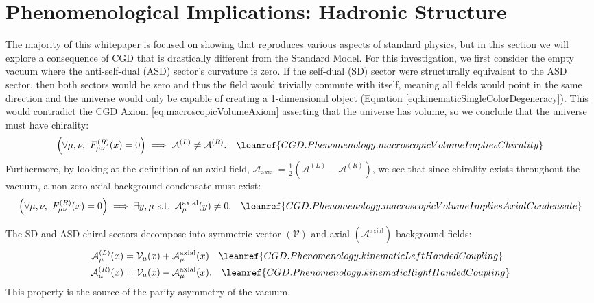 
\section{Phenomenological Implications: Hadronic Structure}
\label{sec:HadronicStructure}

The majority of this whitepaper is focused on showing that \spinFourC reproduces various aspects of standard physics, but in this section we will explore a consequence of CGD that is drastically different from the Standard Model. For this investigation, we first consider the empty vacuum where the anti-self-dual (ASD) sector's curvature is zero. If the self-dual (SD) sector were structurally equivalent to the ASD sector, then both sectors would be zero and thus the field would trivially commute with itself, meaning all fields would point in the same direction and the universe would only be capable of creating a 1-dimensional object (Equation \ref{eq:kinematicSingleColorDegeneracy}). This would contradict the CGD Axiom \ref{eq:macroscopicVolumeAxiom} asserting that the universe has volume, so we conclude that the universe must have chirality:
\begin{equation}
    \left( \forall \mu, \nu, \ F^{(R)}_{\mu\nu}(x) = 0 \right) \implies \mathcal{A}^{(L)} \neq \mathcal{A}^{(R)}.
    \quad \leanref{CGD.Phenomenology.macroscopicVolumeImpliesChirality}
    \label{eq:macroscopicVolumeImpliesChirality}
\end{equation}
\noindent Furthermore, by looking at the definition of an axial field, $\mathcal{A}_{\text{axial}} = \frac{1}{2}(\mathcal{A}^{(L)} - \mathcal{A}^{(R)})$, we see that since chirality exists throughout the vacuum, a non-zero axial background condensate must exist:
\begin{equation}
    \left( \forall \mu, \nu, \ F^{(R)}_{\mu\nu}(x) = 0 \right) \implies \exists y, \mu \text{ s.t. } \mathcal{A}^{\text{axial}}_\mu(y) \neq 0.
    \quad \leanref{CGD.Phenomenology.macroscopicVolumeImpliesAxialCondensate}
    \label{eq:macroscopicVolumeImpliesAxialCondensate}
\end{equation}

The SD and ASD chiral sectors decompose into symmetric vector $(\mathcal{V})$ and axial $(\mathcal{A}^{\text{axial}})$ background fields:
\begin{align}
    \mathcal{A}^{(L)}_\mu(x) &= \mathcal{V}_\mu(x) + \mathcal{A}^{\text{axial}}_\mu(x)
    \quad \leanref{CGD.Phenomenology.kinematicLeftHandedCoupling}
    \label{eq:kinematicLeftHandedCoupling} \\
    \mathcal{A}^{(R)}_\mu(x) &= \mathcal{V}_\mu(x) - \mathcal{A}^{\text{axial}}_\mu(x) .
    \quad \leanref{CGD.Phenomenology.kinematicRightHandedCoupling}
    \label{eq:kinematicRightHandedCoupling}
\end{align}
\noindent This property is the source of the parity asymmetry of the vacuum.


